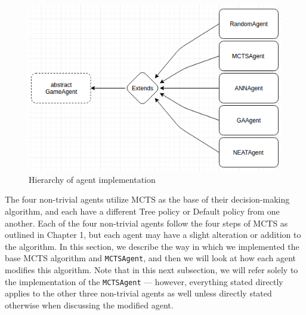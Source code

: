 \begin{figure}[h]
\centering
\includegraphics[scale=0.5]{images/gameagent.png}
\caption{Hierarchy of agent implementation}
\label{fig:agentdiag}
\end{figure}

The four non-trivial agents utilize MCTS as the base of their decision-making algorithm, and each have a different Tree policy or Default policy from one another.  Each of the four non-trivial agents follow the four steps of MCTS as outlined in Chapter 1, but each agent may have a slight alteration or addition to the algorithm.  In this section, we describe the way in which we implemented the base MCTS algorithm and \texttt{MCTSAgent}, and then we will look at how each agent modifies this algorithm.  Note that in this next subsection, we will refer solely to the implementation of the \texttt{MCTSAgent} --- however, everything stated directly applies to the other three non-trivial agents as well unless directly stated otherwise when discussing the modified agent.

